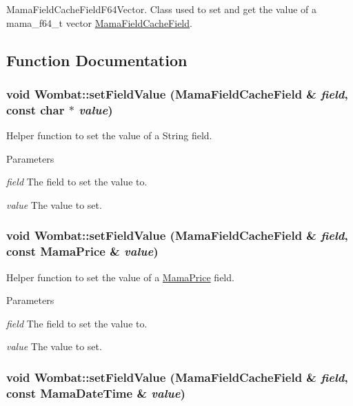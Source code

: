 MamaFieldCacheFieldF64Vector. Class used to set and get the value of a mama\_\-f64\_\-t vector {\ttfamily \hyperlink{classWombat_1_1MamaFieldCacheField}{MamaFieldCacheField}}. 

\subsection{Function Documentation}
\hypertarget{namespaceWombat_a81e7cf2ec14814be5498bbee127e8d0f}{
\subsubsection[{setFieldValue}]{\setlength{\rightskip}{0pt plus 5cm}void Wombat::setFieldValue (MamaFieldCacheField \& {\em field}, \/  const char $\ast$ {\em value})}}
\label{namespaceWombat_a81e7cf2ec14814be5498bbee127e8d0f}


Helper function to set the value of a String field. 
\begin{DoxyParams}{Parameters}
\item[{\em field}]The field to set the value to. \item[{\em value}]The value to set. \end{DoxyParams}
\hypertarget{namespaceWombat_a391c59fa23a46139a567cfe06830c2bd}{
\subsubsection[{setFieldValue}]{\setlength{\rightskip}{0pt plus 5cm}void Wombat::setFieldValue (MamaFieldCacheField \& {\em field}, \/  const MamaPrice \& {\em value})}}
\label{namespaceWombat_a391c59fa23a46139a567cfe06830c2bd}


Helper function to set the value of a \hyperlink{classWombat_1_1MamaPrice}{MamaPrice} field. 
\begin{DoxyParams}{Parameters}
\item[{\em field}]The field to set the value to. \item[{\em value}]The value to set. \end{DoxyParams}
\hypertarget{namespaceWombat_ad857c5a06585509bf1831bbc332c09de}{
\subsubsection[{setFieldValue}]{\setlength{\rightskip}{0pt plus 5cm}void Wombat::setFieldValue (MamaFieldCacheField \& {\em field}, \/  const MamaDateTime \& {\em value})}}
\label{namespaceWombat_ad857c5a06585509bf1831bbc332c09de}


